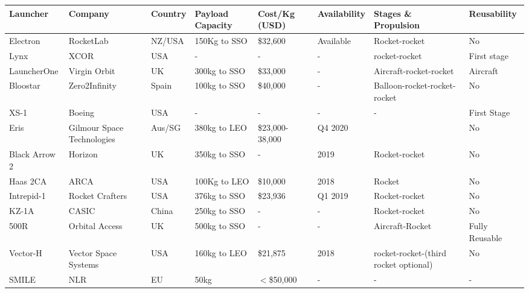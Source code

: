 \begin{landscape}%
	\begin{table}

  \begin{tabularx}{\linewidth}{|X|X|X|X|X|X|X|X|}
  	
  	\hline  \textbf{Launcher} & \textbf{Company} & \textbf{Country} & \textbf{Payload Capacity} & \textbf{Cost/Kg} (USD) & \textbf{Availability }& \textbf{Stages \& Propulsion} & \textbf{Reusability}  \\ 
  	\hline  Electron \cite{Electron} & RocketLab & NZ/USA & 150Kg to SSO & \$32,600 & Available & Rocket-rocket & No \\ 
  	\hline Lynx \cite{Lynx} &  XCOR & USA & - & - & - & rocket-rocket & First stage \\ 
  	\hline LauncherOne \cite{Virgin} & Virgin Orbit & UK & 300kg to SSO & \$33,000 & - & Aircraft-rocket-rocket & Aircraft\\ 
  	\hline Bloostar \cite{Bloostar} & Zero2Infinity & Spain & 100kg to SSO & \$40,000 &  - & Balloon-rocket-rocket-rocket & No \\ 
  	\hline XS-1 \cite{DARPA2017} & Boeing & USA & - & - &  - & - & First Stage\\ 
  	\hline Eris \cite{Gilmour} & Gilmour Space Technologies & Aus/SG& 380kg to LEO  &\$23,000-38,000   & Q4 2020 && No\\ 
  	\hline Black Arrow 2 \cite{Horizon}& Horizon   & UK & 350kg to SSO & - & 2019 & Rocket-rocket & No \\ 
  	\hline Haas 2CA \cite{ARCA} & ARCA  & USA & 100Kg to LEO & \$10,000 & 2018 & Rocket & No \\ 
  	\hline Intrepid-1 \cite{Intrepid} & Rocket Crafters  & USA & 376kg to SSO & \$23,936 & Q1 2019 & Rocket-rocket & No \\ 
  	\hline KZ-1A \cite{FT1} & CASIC  &  China & 250kg to SSO  & - & - & Rocket-rocket & No \\ 
  	\hline 500R \cite{500R} & Orbital Access  & UK & 500kg to SSO & - & - & Aircraft-Rocket & Fully Reusable \\ 
  	\hline Vector-H \cite{Vector}& Vector Space Systems  & USA & 160kg to LEO  & \$21,875 & 2018 & rocket-rocket-(third rocket optional)& No\\ 
  	\hline SMILE \cite{Kuhn2017} & NLR &  EU & 50kg & $<$\$50,000 & -  & -& -\\ 
  	\hline 
  \end{tabularx} 
  \label{tab:smallsats}
\end{table}
\end{landscape}
